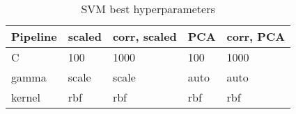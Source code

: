 \begin{table}[!htb]
\caption{SVM best hyperparameters}
\label{table-svm-params}
\centering
\begin{tabular}{lllll}
\toprule
Pipeline & scaled & corr, scaled & PCA & corr, PCA \\
\midrule
C & 100 & 1000 & 100 & 1000 \\
gamma & scale & scale & auto & auto \\
kernel & rbf & rbf & rbf & rbf \\
\bottomrule
\end{tabular}
\end{table}
